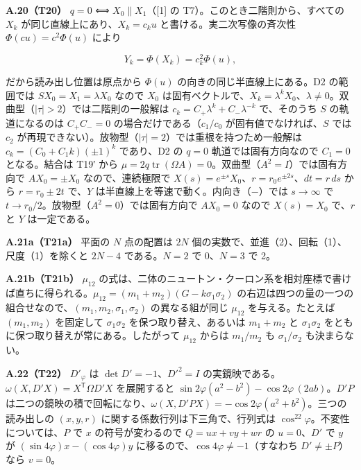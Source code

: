 \documentclass[
  a4paper,
]{ltjsarticle}
\begin{document}
\textbf{A.20（T20）} \(q=0\) ⟺ \(X_0\parallel X_1\)（{[}1{]} の
T7）。このとき二階則から、すべての \(X_k\)
が同じ直線上にあり、\(X_k=c_ku\) と書ける。実二次写像の斉次性
\(\Phi(cu)=c^2\Phi(u)\) により

\[
Y_k=\Phi(X_k)=c_k^2\Phi(u),
\]

だから読み出し位置は原点から \(\Phi(u)\) の向きの同じ半直線上にある。D2
の範囲では \(SX_0=X_1=\lambda X_0\) なので \(X_0\)
は固有ベクトルで、\(X_k=\lambda^kX_0\)、\(\lambda\neq0\)。双曲型（\(\lvert\tau\rvert>2\)）では二階則の一般解は
\(c_k=C_+\lambda^k+C_-\lambda^{-k}\) で、そのうち \(S\) の軌道になるのは
\(C_+C_-=0\) の場合だけである（\(c_1/c_0\) が固有値でなければ、\(S\)
では \(c_2\)
が再現できない）。放物型（\(\lvert\tau\rvert=2\)）では重根を持つため一般解は
\(c_k=(C_0+C_1k)(\pm1)^k\) であり、D2 の \(q=0\) 軌道では固有方向なので
\(C_1=0\) となる。結合は T19′ から
\(\mu=2q\operatorname{tr}(\Omega A)=0\)。双曲型（\(A^2=I\)）では固有方向で
\(AX_0=\pm X_0\) なので、連続極限で
\(X(s)=e^{\pm s}X_0\)、\(r=r_0e^{\pm2s}\)、\(dt=r\,ds\) から
\(r=r_0\pm2t\) で、\(Y\) は半直線上を等速で動く。内向き（\(-\)）では
\(s\to\infty\) で \(t\to r_0/2\)。放物型（\(A^2=0\)）では固有方向で
\(AX_0=0\) なので \(X(s)=X_0\) で、\(r\) と \(Y\) は一定である。

\textbf{A.21a（T21a）} 平面の \(N\) 点の配置は \(2N\)
個の実数で、並進（2）、回転（1）、尺度（1）を除くと \(2N-4\)
である。\(N=2\) で 0、\(N=3\) で 2。

\textbf{A.21b（T21b）} \(\mu_{12}\)
の式は、二体のニュートン・クーロン系を相対座標で書けば直ちに得られる。\(\mu_{12}=(m_1+m_2)(G-k\sigma_1\sigma_2)\)
の右辺は四つの量の一つの組合せなので、\((m_1,m_2,\sigma_1,\sigma_2)\)
の異なる組が同じ \(\mu_{12}\) を与える。たとえば \((m_1,m_2)\)
を固定して \(\sigma_1\sigma_2\) を保つ取り替え、あるいは \(m_1+m_2\) と
\(\sigma_1\sigma_2\) をともに保つ取り替えが常にある。したがって
\(\mu_{12}\) からは \(m_1/m_2\) も \(\sigma_1/\sigma_2\) も決まらない。

\textbf{A.22（T22）} \(D'_\varphi\) は \(\det D'=-1\)、\(D'^2=I\)
の実鏡映である。\(\omega(X,D'X)=X^{\mathsf T}\Omega D'X\) を展開すると
\(\sin2\varphi(a^2-b^2)-\cos2\varphi\,(2ab)\)。\(D'P\)
は二つの鏡映の積で回転になり、\(\omega(X,D'PX)=-\cos2\varphi(a^2+b^2)\)。三つの読み出しの
\((x,y,r)\) に関する係数行列は下三角で、行列式は
\(\cos^22\varphi\)。不変性については、\(P\) で \(x\) の符号が変わるので
\(Q=ux+vy+wr\) の \(u=0\)、\(D'\) で \(y\) が
\((\sin4\varphi)x-(\cos4\varphi)y\)
に移るので、\(\cos4\varphi\neq-1\)（すなわち \(D'\neq\pm P\)）なら
\(v=0\)。
\end{document}
